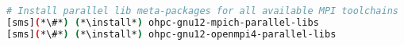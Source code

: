 
\begin{lstlisting}[language=bash,keywords={},upquote=true,keepspaces]
# Install parallel lib meta-packages for all available MPI toolchains
[sms](*\#*) (*\install*) ohpc-gnu12-mpich-parallel-libs
[sms](*\#*) (*\install*) ohpc-gnu12-openmpi4-parallel-libs
\end{lstlisting}
